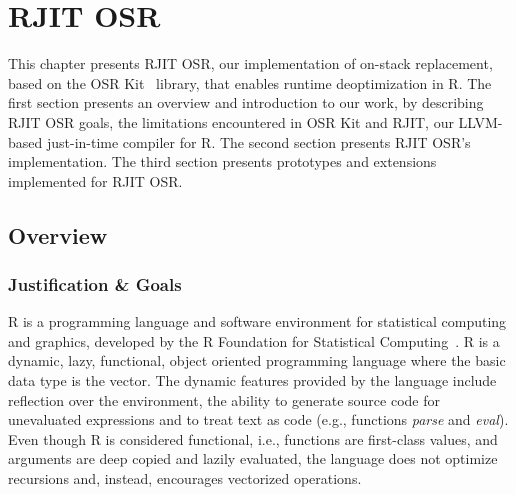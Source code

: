 
\chapter{RJIT OSR} %

\label{Chapter4New} %


\newcommand{\keyword}[1]{\textbf{#1}}
\newcommand{\tabhead}[1]{\textbf{#1}}
\newcommand{\code}[1]{\texttt{#1}}
\newcommand{\file}[1]{\texttt{\bfseries#1}}
\newcommand{\option}[1]{\texttt{\itshape#1}}

This chapter presents RJIT OSR, our implementation of on-stack replacement, based on the OSR Kit~\cite{OSRKit} library, that enables runtime deoptimization in R.
The first section presents an overview and introduction to our work, by describing RJIT OSR goals, the limitations encountered in OSR Kit and RJIT, our LLVM-based just-in-time compiler for R.
The second section presents RJIT OSR's implementation.
The third section presents prototypes and extensions implemented for RJIT OSR.

\section{Overview}
\subsection{Justification \& Goals}\label{justificationgoals}
            
R is a programming language and software environment for statistical computing and graphics, developed by the R Foundation for Statistical Computing~\cite{RURL}.
R is a dynamic, lazy, functional, object oriented programming language where the basic data type is the vector.
The dynamic features provided by the language include reflection over the environment, the ability to generate source code for unevaluated expressions and to treat text as code (e.g., functions \textit{parse} and \textit{eval}).
Even though R is considered functional, i.e., functions are first-class values, and arguments are deep copied and lazily evaluated, the language does not optimize recursions and, instead, encourages vectorized operations.\\

